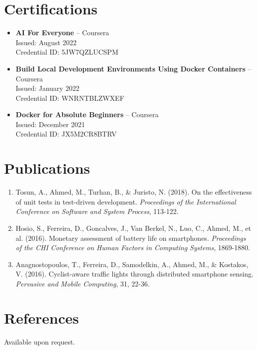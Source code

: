 \documentclass[12pt]{article}
\begin{document}
\section*{Certifications}\label{certifications}

\begin{itemize}[leftmargin=1.5em]
    \item \textbf{AI For Everyone} -- Coursera \\
    Issued: August 2022 \\
    Credential ID: 5JW7QZLUCSPM
    \item \textbf{Build Local Development Environments Using Docker Containers} -- Coursera \\
    Issued: January 2022 \\
    Credential ID: WNRNTBLZWXEF
    \item \textbf{Docker for Absolute Beginners} -- Coursera \\
    Issued: December 2021 \\
    Credential ID: JX5M2CR8BTRV
\end{itemize}

\section*{Publications}\label{publications}

\begin{enumerate}[leftmargin=1.5em]
    \item Tosun, A., Ahmed, M., Turhan, B., \& Juristo, N. (2018). On the effectiveness of unit tests in test-driven development. \textit{Proceedings of the International Conference on Software and System Process}, 113-122.
    \item Hosio, S., Ferreira, D., Goncalves, J., Van Berkel, N., Luo, C., Ahmed, M., et al. (2016). Monetary assessment of battery life on smartphones. \textit{Proceedings of the CHI Conference on Human Factors in Computing Systems}, 1869-1880.
    \item Anagnostopoulos, T., Ferreira, D., Samodelkin, A., Ahmed, M., \& Kostakos, V. (2016). Cyclist-aware traffic lights through distributed smartphone sensing. \textit{Pervasive and Mobile Computing}, 31, 22-36.
\end{enumerate}

\section*{References}

Available upon request.
\end{document}
